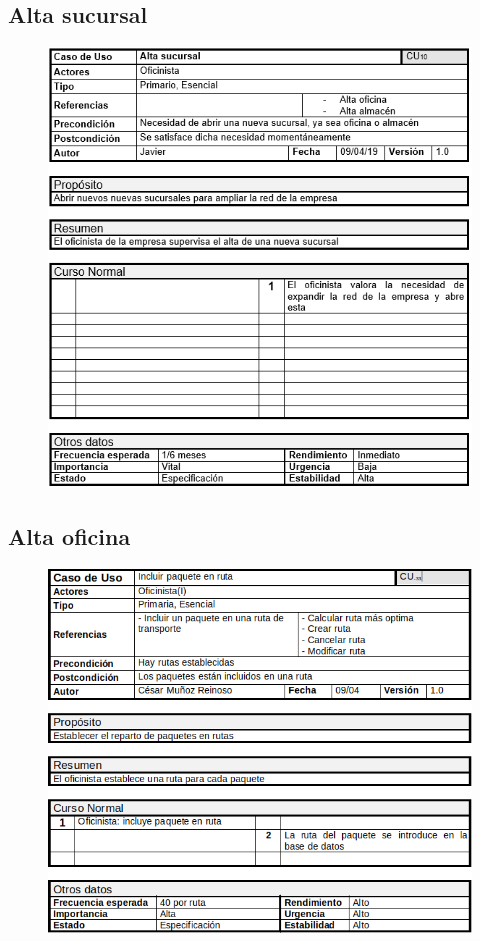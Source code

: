 \subsection{Alta sucursal}
\begin{figure}[H]
	\centering
	\includegraphics[width=16cm]{10}
\end{figure}
\subsection{Alta oficina}
\begin{figure}[H]
	\centering
	\includegraphics[width=16cm]{11}
\end{figure}
